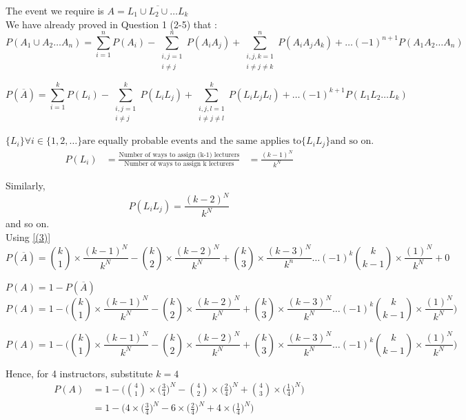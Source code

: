 \documentclass{article}
\begin{document}
The event we require is $A = \overline{L_1 \cup L_2 \cup \dots L_k}$ \\

We have already proved in Question 1 (2-5) that : \\
$$ P(A_1 \cup A_2 \dots A_n) = \sum_{i=1}^{n}P(A_i)  -  \sum_{\substack{i,j =1 \\ i \neq j}}^{n}P(A_i A_j)  +  \sum_{\substack{i,j,k = 1 \\ i \neq j \neq k}}^{n}P(A_i A_j A_k)  +  \dots   (-1)^{n+1}P(A_1 A_2 \dots A_n)$$

\begin{equation}
\label{(3)}
 P(\overline{A}) = \sum_{i=1}^{k}P(L_i)  -  \sum_{\substack{i,j =1 \\ i \neq j}}^{k}P(L_i L_j)  +  \sum_{\substack{i,j,l = 1 \\ i \neq j \neq l}}^{k}P(L_i L_j L_l)  +  \dots   (-1)^{k+1}P(L_1 L_2 \dots L_k)
\end{equation}

$\{L_i\} \forall   i \in \{1,2, \dots \} \text{are equally probable events and the same applies to} \{L_i L_j\} \text{and so on.}$ \\
\begin{align*}
P(L_i) &= \frac{\text{Number of ways to assign (k-1) lecturers}}{\text{Number of ways to assign k lecturers}}
 &= \frac{(k-1)^N}{k^N}
\end{align*}

Similarly,$$P(L_i L_j) = \frac{(k-2)^N}{k^N}$$
and so on. \\

Using \ref{(3)}
$$P(\overline{A}) = {k \choose 1} \times \frac{(k-1)^N}{k^N} - {k \choose 2} \times \frac{(k-2)^N}{k^N} + {k \choose 3} \times \frac{(k-3)^N}{k^n} \dots (-1)^k {k \choose k-1} \times \frac{(1)^N}{k^N} + 0$$

$ P(A) = 1 - P(\overline{A}) $ \\
$$ P(A) = 1 - \Bigg({k \choose 1} \times \frac{(k-1)^N}{k^N} - {k \choose 2} \times \frac{(k-2)^N}{k^N} + {k \choose 3} \times \frac{(k-3)^N}{k^N} \dots (-1)^k {k \choose k-1} \times \frac{(1)^N}{k^N} \Bigg)$$

$$ P(A) = 1 - \Bigg({k \choose 1} \times \frac{(k-1)^N}{k^N} - {k \choose 2} \times \frac{(k-2)^N}{k^N} + {k \choose 3} \times \frac{(k-3)^N}{k^N} \dots (-1)^k {k \choose k-1} \times \frac{(1)^N}{k^N} \Bigg)$$

Hence, for 4 instructors, substitute $ k = 4 $ \\
\begin{align*}
P(A) &= 1 - \Bigg({4 \choose 1} \times \bigg(\frac{3}{4}\bigg)^N - {4 \choose 2} \times \bigg(\frac{2}{4}\bigg)^N + {4 \choose 3} \times \bigg(\frac{1}{4}\bigg)^N \Bigg) \\
& = 1 - \Bigg(4 \times \bigg(\frac{3}{4}\bigg)^N - 6 \times \bigg(\frac{2}{4}\bigg)^N + 4 \times \bigg(\frac{1}{4}\bigg)^N \Bigg)
\end{align*}
\end{document}
